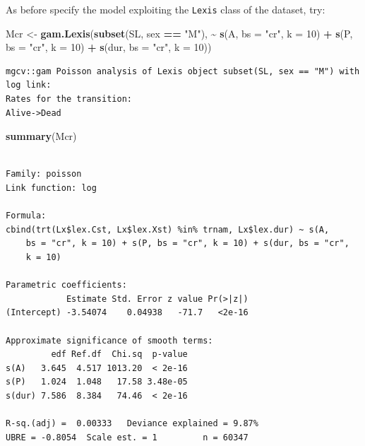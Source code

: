 \documentclass[
]{book}
\newenvironment{Shaded}{\begin{snugshade}}{\end{snugshade}}
\newcommand{\AttributeTok}[1]{\textcolor[rgb]{0.13,0.29,0.53}{#1}}
\newcommand{\DecValTok}[1]{\textcolor[rgb]{0.00,0.00,0.81}{#1}}
\newcommand{\FunctionTok}[1]{\textcolor[rgb]{0.13,0.29,0.53}{\textbf{#1}}}
\newcommand{\NormalTok}[1]{#1}
\newcommand{\OtherTok}[1]{\textcolor[rgb]{0.56,0.35,0.01}{#1}}
\newcommand{\SpecialCharTok}[1]{\textcolor[rgb]{0.81,0.36,0.00}{\textbf{#1}}}
\newcommand{\StringTok}[1]{\textcolor[rgb]{0.31,0.60,0.02}{#1}}
\begin{document}
\begin{enumerate}
  As before specify the model exploiting the \texttt{Lexis} class
  of the dataset, try:

\begin{Shaded}
\begin{Highlighting}[]
\NormalTok{Mcr }\OtherTok{\textless{}{-}} \FunctionTok{gam.Lexis}\NormalTok{(}\FunctionTok{subset}\NormalTok{(SL, sex }\SpecialCharTok{==} \StringTok{"M"}\NormalTok{),}
                 \SpecialCharTok{\textasciitilde{}} \FunctionTok{s}\NormalTok{(A, }\AttributeTok{bs =} \StringTok{"cr"}\NormalTok{, }\AttributeTok{k =} \DecValTok{10}\NormalTok{) }\SpecialCharTok{+}
                   \FunctionTok{s}\NormalTok{(P, }\AttributeTok{bs =} \StringTok{"cr"}\NormalTok{, }\AttributeTok{k =} \DecValTok{10}\NormalTok{) }\SpecialCharTok{+}
                 \FunctionTok{s}\NormalTok{(dur, }\AttributeTok{bs =} \StringTok{"cr"}\NormalTok{, }\AttributeTok{k =} \DecValTok{10}\NormalTok{))}
\end{Highlighting}
\end{Shaded}

\begin{verbatim}
mgcv::gam Poisson analysis of Lexis object subset(SL, sex == "M") with log link:
Rates for the transition:
Alive->Dead
\end{verbatim}

\begin{Shaded}
\begin{Highlighting}[]
\FunctionTok{summary}\NormalTok{(Mcr)}
\end{Highlighting}
\end{Shaded}

\begin{verbatim}

Family: poisson 
Link function: log 

Formula:
cbind(trt(Lx$lex.Cst, Lx$lex.Xst) %in% trnam, Lx$lex.dur) ~ s(A, 
    bs = "cr", k = 10) + s(P, bs = "cr", k = 10) + s(dur, bs = "cr", 
    k = 10)

Parametric coefficients:
            Estimate Std. Error z value Pr(>|z|)
(Intercept) -3.54074    0.04938   -71.7   <2e-16

Approximate significance of smooth terms:
         edf Ref.df  Chi.sq  p-value
s(A)   3.645  4.517 1013.20  < 2e-16
s(P)   1.024  1.048   17.58 3.48e-05
s(dur) 7.586  8.384   74.46  < 2e-16

R-sq.(adj) =  0.00333   Deviance explained = 9.87%
UBRE = -0.8054  Scale est. = 1         n = 60347
\end{verbatim}


\end{enumerate}
\end{document}
